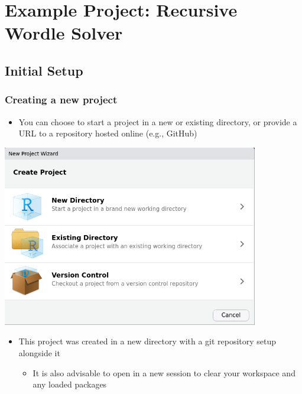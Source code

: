 \documentclass[
]{article}
\providecommand{\tightlist}{%
  \setlength{\itemsep}{0pt}\setlength{\parskip}{0pt}}
\begin{document}
\newpage

\hypertarget{example-project-recursive-wordle-solver}{%
\section{Example Project: Recursive Wordle
Solver}\label{example-project-recursive-wordle-solver}}

\hypertarget{initial-setup}{%
\subsection{Initial Setup}\label{initial-setup}}

\hypertarget{creating-a-new-project}{%
\subsubsection{Creating a new project}\label{creating-a-new-project}}

\begin{itemize}
\tightlist
\item
  You can choose to start a project in a new or existing directory, or
  provide a URL to a repository hosted online (e.g., GitHub)
\end{itemize}

\includegraphics[width=4.40625in,height=\textheight]{images/create_project.png}

\begin{itemize}
\item
  This project was created in a new directory with a git repository
  setup alongside it

  \begin{itemize}
  \tightlist
  \item
    It is also advisable to open in a new session to clear your
    workspace and any loaded packages
  \end{itemize}
\end{itemize}
\end{document}
